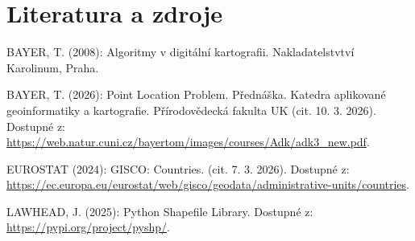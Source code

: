 \section{Literatura a zdroje}

BAYER, T. (2008): Algoritmy v digitální kartografii. Nakladatelstvtví Karolinum, Praha.

BAYER, T. (2026): Point Location Problem. Přednáška.
Katedra aplikované geoinformatiky a kartografie. Přírodovědecká fakulta UK (cit. 10. 3. 2026). Dostupné z: \url{https://web.natur.cuni.cz/bayertom/images/courses/Adk/adk3_new.pdf}.

EUROSTAT (2024): GISCO: Countries. (cit. 7. 3. 2026). Dostupné z: \url{https://ec.europa.eu/eurostat/web/gisco/geodata/administrative-units/countries}.

LAWHEAD, J. (2025): Python Shapefile Library. Dostupné z: \url{https://pypi.org/project/pyshp/}.